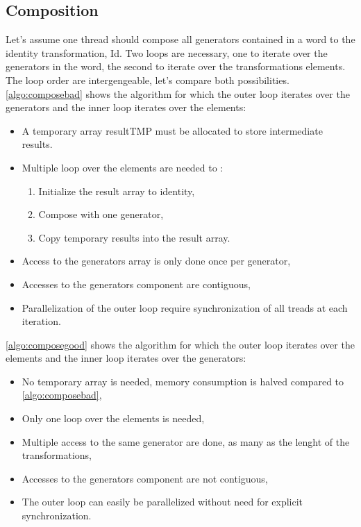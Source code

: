 {\subsection{Composition}
\label{part:compose}
Let's assume one thread should compose all generators contained in a word to the identity transformation, Id. 
Two loops are necessary, one to iterate over the generators in the word, the second to iterate over the transformations elements.
The loop order are intergengeable, let's compare both possibilities.
\autoref{algo:composebad} shows the algorithm for which the outer loop iterates over the generators and the inner loop iterates over the elements:
\begin{itemize}
\item A temporary array resultTMP must be allocated to store intermediate results.
\item Multiple loop over the elements are needed to :
\begin{enumerate}
 \item Initialize the result array to identity,
 \item Compose with one generator,
 \item Copy temporary results into the result array.
 \end{enumerate}
\item Access to the generators array is only done once per generator,
 \item Accesses to the generators component are contiguous,
 \item Parallelization of the outer loop require synchronization of all treads at each iteration.
\end{itemize}
\autoref{algo:composegood} shows the algorithm for which the outer loop iterates over the elements and the inner loop iterates over the generators:
\begin{itemize}
 \item No temporary array is needed, memory consumption is halved compared to \autoref{algo:composebad},
 \item Only one loop over the elements is needed,
 \item Multiple access to the same generator are done, as many as the lenght of the transformations,
 \item Accesses to the generators component are not contiguous,
 \item The outer loop can easily be parallelized without need for explicit synchronization.
\end{itemize}

}

